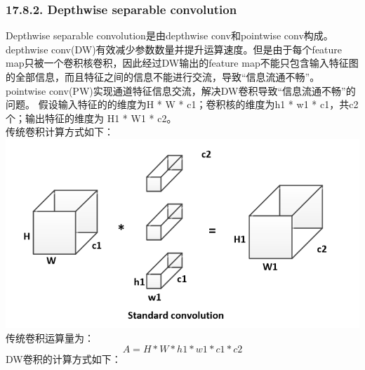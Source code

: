 \subsubsection{17.8.2. Depthwise separable
convolution}\label{depthwise-separable-convolution}

Depthwise separable convolution是由depthwise conv和pointwise
conv构成。\\
depthwise conv(DW)有效减少参数数量并提升运算速度。但是由于每个feature
map只被一个卷积核卷积，因此经过DW输出的feature
map不能只包含输入特征图的全部信息，而且特征之间的信息不能进行交流，导致``信息流通不畅''。\\
pointwise
conv(PW)实现通道特征信息交流，解决DW卷积导致``信息流通不畅''的问题。
假设输入特征的的维度为H * W * c1；卷积核的维度为h1 * w1 *
c1，共c2个；输出特征的维度为 H1 * W1 * c2。\\
传统卷积计算方式如下：\\
\includegraphics{./img/ch17/3.png} 传统卷积运算量为：\\
\[
A = H * W * h1 * w1 * c1 * c2
\] DW卷积的计算方式如下：\\
